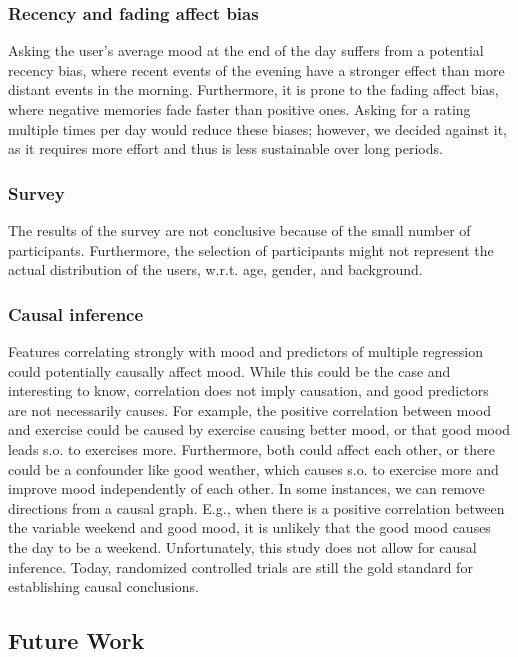 \documentclass[conference]{IEEEtran}
\begin{document}
\subsubsection{Recency and fading affect bias}
Asking the user's average mood at the end of the day suffers from a potential recency bias\cite{cushing_barry_e_mitigation_1996}, where recent events of the evening have a stronger effect than more distant events in the morning. Furthermore, it is prone to the fading affect bias, where negative memories fade faster than positive ones\cite{skowronski_chapter_2014}.
Asking for a rating multiple times per day would reduce these biases; however, we decided against it, as it requires more effort and thus is less sustainable over long periods.  


\subsubsection{Survey}
The results of the survey are not conclusive because of the small number of participants. Furthermore, the selection of participants might not represent the actual distribution of the users, w.r.t. age, gender, and background.


\subsubsection{Causal inference}
Features correlating strongly with mood and predictors of multiple regression could potentially causally affect mood. While this could be the case and interesting to know, correlation does not imply causation, and good predictors are not necessarily causes.
For example, the positive correlation between mood and exercise could be caused by exercise causing better mood, or that good mood leads s.o. to exercises more. Furthermore, both could affect each other, or there could be a confounder like good weather, which causes s.o. to exercise more and improve mood independently of each other.
In some instances, we can remove directions from a causal graph.
E.g., when there is a positive correlation between the variable weekend and good mood, it is unlikely that the good mood causes the day to be a weekend. Unfortunately, this study does not allow for causal inference. Today, randomized controlled trials are still the gold standard for establishing causal conclusions\cite{hariton_randomised_2018}. 



\subsection{Future Work}
\end{document}
